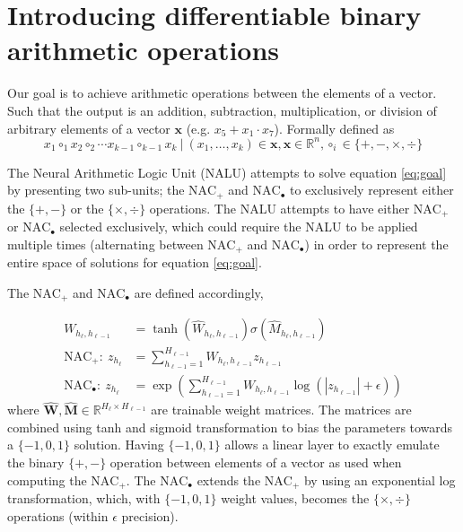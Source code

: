 \section{Introducing differentiable binary arithmetic operations}
Our goal is to achieve arithmetic operations between the elements of a vector. Such that the output is an addition, subtraction, multiplication, or division of arbitrary elements of a vector $\mathbf{x}$ (e.g. ${x_5 + x_1 \cdot x_7}$). Formally defined as
\begin{equation}
x_1\circ_1 x_2 \circ_2 \cdots x_{k-1} \circ_{k-1} x_{k}\ |\ (x_1, \dots, x_k) \in \mathbf{x}, \mathbf{x} \in \mathbb{R}^n, \circ_i \in \{+, -, \times, \div \}
\label{eq:goal}
\end{equation}

The Neural Arithmetic Logic Unit (NALU) \cite{trask-nalu} attempts to solve equation \ref{eq:goal} by presenting two sub-units; the $\text{NAC}_{+}$ and $\text{NAC}_{\bullet}$ to exclusively represent either the $\{+, -\}$ or the $\{\times, \div \}$ operations.
The NALU attempts to have either $\text{NAC}_{+}$ or $\text{NAC}_{\bullet}$ selected exclusively, which could require the NALU to be applied multiple times (alternating between $\text{NAC}_{+}$ and $\text{NAC}_{\bullet}$) in order to represent the entire space of solutions for equation \ref{eq:goal}.

The $\text{NAC}_{+}$ and $\text{NAC}_{\bullet}$ are defined accordingly,

\begin{align}
W_{h_\ell, h_{\ell-1}} &= \tanh(\hat{W}_{h_\ell, h_{\ell-1}}) \sigma(\hat{M}_{h_\ell, h_{\ell-1}}) \label{eq:weight}\\
\textrm{NAC}_+:\ z_{h_\ell} &= \sum_{h_{\ell-1}=1}^{H_{\ell-1}} W_{h_{\ell}, h_{\ell-1}} z_{h_{\ell-1}} \label{eq:naca}\\
\textrm{NAC}_\bullet:\ z_{h_\ell} &= \exp\left(\sum_{h_{\ell-1}=1}^{H_{\ell-1}} W_{h_{\ell}, h_{\ell-1}} \label{eq:nacm}\log(|z_{h_{\ell-1}}| + \epsilon) \right)
\end{align}
where $\hat{\mathbf{W}}, \hat{\mathbf{M}} \in \mathbb{R}^{H_{\ell} \times H_{\ell-1}}$ are trainable weight matrices. The matrices are combined using tanh and sigmoid transformation to bias the parameters towards a $\{-1,0,1\}$ solution. Having $\{-1,0,1\}$ allows a linear layer to exactly emulate the binary $\{+, -\}$ operation between elements of a vector as used when computing the $\text{NAC}_{+}$.
The $\text{NAC}_{\bullet}$ extends the $\text{NAC}_{+}$ by using an exponential log transformation, which, with $\{-1,0,1\}$ weight values, becomes the $\{\times, \div \}$ operations (within $\epsilon$ precision).

